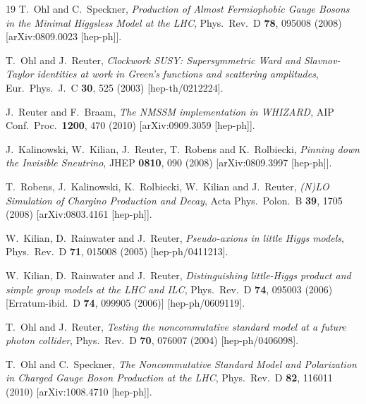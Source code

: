 \documentclass[12pt]{book}
\begin{document}
\begin{thebibliography}{19}
  T.~Ohl and C.~Speckner,
  {\em Production of Almost Fermiophobic Gauge Bosons in the Minimal
    Higgsless Model at the LHC},
  Phys.\ Rev.\ D {\bf 78}, 095008 (2008)
  [arXiv:0809.0023 [hep-ph]].

  T.~Ohl and J.~Reuter,
  {\em Clockwork SUSY: Supersymmetric Ward and Slavnov-Taylor
    identities at work in Green's functions and scattering
    amplitudes},
  Eur.\ Phys.\ J.\ C {\bf 30}, 525 (2003)
  [hep-th/0212224].

  J.~Reuter and F.~Braam,
  {\em The NMSSM implementation in WHIZARD},
  AIP Conf.\ Proc.\  {\bf 1200}, 470 (2010)
  [arXiv:0909.3059 [hep-ph]].

  J.~Kalinowski, W.~Kilian, J.~Reuter, T.~Robens and K.~Rolbiecki,
  {\em Pinning down the Invisible Sneutrino},
  JHEP {\bf 0810}, 090 (2008)
  [arXiv:0809.3997 [hep-ph]].

  T.~Robens, J.~Kalinowski, K.~Rolbiecki, W.~Kilian and J.~Reuter,
  {\em (N)LO Simulation of Chargino Production and Decay},
  Acta Phys.\ Polon.\ B {\bf 39}, 1705 (2008)
  [arXiv:0803.4161 [hep-ph]].

  W.~Kilian, D.~Rainwater and J.~Reuter,
  {\em Pseudo-axions in little Higgs models},
  Phys.\ Rev.\ D {\bf 71}, 015008 (2005)
  [hep-ph/0411213].

  W.~Kilian, D.~Rainwater and J.~Reuter,
  {\em Distinguishing little-Higgs product and simple group models at
    the LHC and ILC},
  Phys.\ Rev.\ D {\bf 74}, 095003 (2006)
  [Erratum-ibid.\ D {\bf 74}, 099905 (2006)]
  [hep-ph/0609119].

  T.~Ohl and J.~Reuter,
  {\em Testing the noncommutative standard model at a future photon
    collider},
  Phys.\ Rev.\ D {\bf 70}, 076007 (2004)
  [hep-ph/0406098].

  T.~Ohl and C.~Speckner,
  {\em The Noncommutative Standard Model and Polarization in Charged
    Gauge Boson Production at the LHC},
  Phys.\ Rev.\ D {\bf 82}, 116011 (2010)
  [arXiv:1008.4710 [hep-ph]].


\end{thebibliography}
\end{document}
